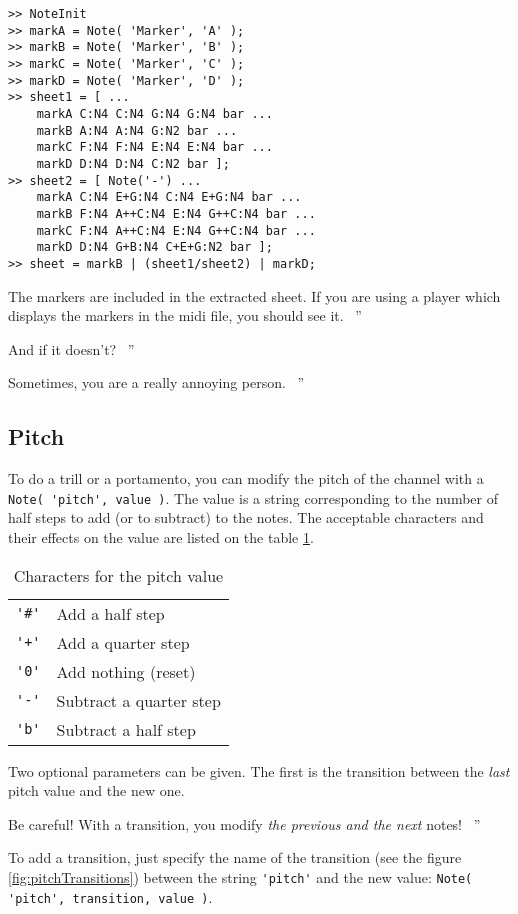 \documentclass{article}
\newenvironment{meenv}{ \par \noindent \makebox[6em][r]{ \textcolor{mecolor}{Me}: `` --~}}{~''}
\newenvironment{myselfenv}{ \par \noindent \makebox[6em][r]{ \textcolor{myselfcolor}{Myself}: `` --~}}{~''}
\newcommand{ \me }[1]{%
\begin{meenv}%
	#1%
\end{meenv} }
\newcommand{ \myself }[1]{%
\begin{myselfenv}%
	#1%
\end{myselfenv} }
\begin{document}
\begin{lstlisting}
>> NoteInit
>> markA = Note( 'Marker', 'A' );
>> markB = Note( 'Marker', 'B' );
>> markC = Note( 'Marker', 'C' );
>> markD = Note( 'Marker', 'D' );
>> sheet1 = [ ...
	markA C:N4 C:N4 G:N4 G:N4 bar ...
	markB A:N4 A:N4 G:N2 bar ...
	markC F:N4 F:N4 E:N4 E:N4 bar ...
	markD D:N4 D:N4 C:N2 bar ];
>> sheet2 = [ Note('-') ...
	markA C:N4 E+G:N4 C:N4 E+G:N4 bar ...
	markB F:N4 A++C:N4 E:N4 G++C:N4 bar ...
	markC F:N4 A++C:N4 E:N4 G++C:N4 bar ...
	markD D:N4 G+B:N4 C+E+G:N2 bar ];
>> sheet = markB | (sheet1/sheet2) | markD;
\end{lstlisting}

\myself{The markers are included in the extracted sheet. If you are using a player which displays the markers in the midi file, you should see it.}
\me{And if it doesn't?}
\myself{Sometimes, you are a really annoying person.}

\subsection{Pitch}
\label{sec:Pitch}

To do a trill or a portamento, you can modify the pitch of the channel with a \lstinline!Note( 'pitch', value )!. The value is a string corresponding to the number of half steps to add (or to subtract) to the notes. The acceptable characters and their effects on the value are listed on the table \ref{tab:pitchValue}.

\begin{table}
	\centering
	\begin{tabular}{cl}
		\lstinline!'#'! & Add a half step \\
		\lstinline!'+'! & Add a quarter step \\
		\lstinline!'0'! & Add nothing (reset) \\
		\lstinline!'-'! & Subtract a quarter step \\
		\lstinline!'b'! & Subtract a half step \\
	\end{tabular}
	\caption{Characters for the pitch value}
	\label{tab:pitchValue}
\end{table}

Two optional parameters can be given. The first is the transition between the \emph{last} pitch value and the new one.

\myself{Be careful! With a transition, you modify \emph{the previous and the next} notes!}

To add a transition, just specify the name of the transition (see the figure \ref{fig:pitchTransitions}) between the string \lstinline!'pitch'! and the new value: \lstinline!Note( 'pitch', transition, value )!.
\end{document}

